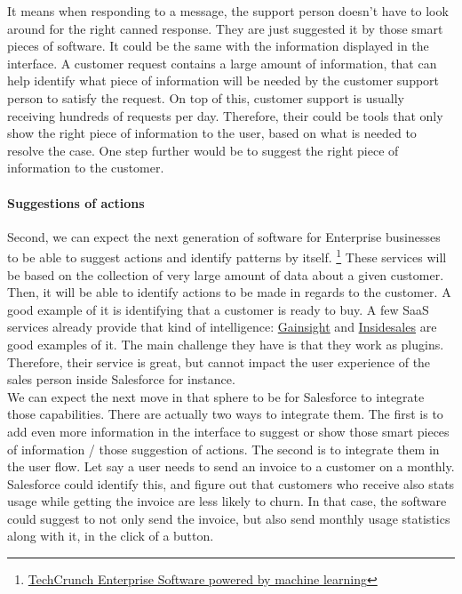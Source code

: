 \documentclass[12pt]{article}
\begin{document}
\smallskip

It means when responding to a message, the support person doesn't have to look
around for the right canned response. They are just suggested it by those smart
pieces of software. It could be the same with the information displayed in the
interface. A customer request contains a large amount of information, that can
help identify what piece of information will be needed by the customer support
person to satisfy the request. On top of this, customer support is usually
receiving hundreds of requests per day. Therefore, their could be tools that
only show the right piece of information to the user, based on what is needed to
resolve the case. One step further would be to suggest the right piece of
information to the customer.

\paragraph{Suggestions of actions}

Second, we can expect the next generation of software for Enterprise businesses
to be able to suggest actions and identify patterns by itself.
\footnote{\href{http://techcrunch.com/2015/07/27/the-next-wave-of-enterprise-software-powered-by-machine-learning}
{TechCrunch Enterprise Software powered by machine learning}}
These services will be based on the collection of very large amount of data about
a given customer. Then, it will be able to identify actions to be made in regards
to the customer. A good example of it is identifying that a customer is ready to
buy. A few SaaS services already provide that kind of intelligence:
\href{http://www.gainsight.com/}{Gainsight} and
\href{http://uk.insidesales.com/}{Insidesales} are good examples of it.
The main challenge they have is that they work as plugins. Therefore, their
service is great, but cannot impact the user experience of the sales person
inside Salesforce for instance.\\

We can expect the next move in that sphere to be for Salesforce to integrate
those capabilities. There are actually two ways to integrate them. The first
is to add even more information in the interface to suggest or show those smart
pieces of information / those suggestion of actions. The second is to integrate
them in the user flow. Let say a user needs to send an invoice to a customer on
a monthly. Salesforce could identify this, and figure out that customers who
receive also stats usage while getting the invoice are less likely to churn. In
that case, the software could suggest to not only send the invoice, but also
send monthly usage statistics along with it, in the click of a button.\\
\end{document}
